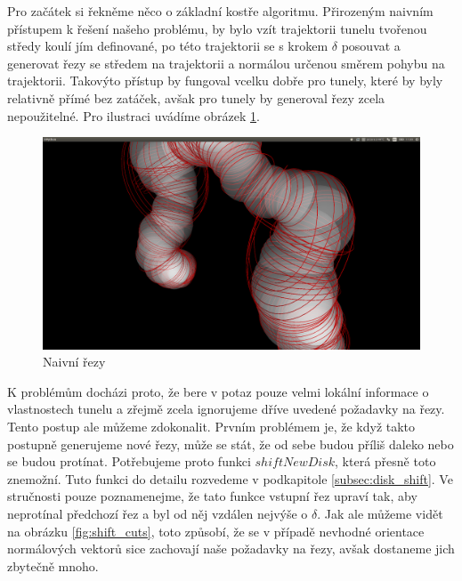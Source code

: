 Pro začátek si řekněme něco o základní kostře algoritmu. Přirozeným naivním přístupem
k řešení našeho problému, by bylo vzít trajektorii tunelu tvořenou středy koulí
jím definované, po této trajektorii se s krokem $ \delta $ posouvat a generovat
řezy se středem na trajektorii a normálou určenou směrem pohybu na trajektorii.
Takovýto přístup by fungoval vcelku dobře pro tunely, které by byly relativně
přímé bez zatáček, avšak pro  tunely by generoval řezy zcela nepoužitelné.
Pro ilustraci uvádíme obrázek \ref{fig:naive_cuts}.

\begin{figure}
    \centering
    \includegraphics[width=\textwidth]{img/naive_cuts.png}
    \caption{Naivní řezy}
  \centering
  \label{fig:naive_cuts}
\end{figure}

K problémům docházi proto, že bere v potaz pouze velmi lokální informace o vlastnostech
tunelu a zřejmě zcela ignorujeme dříve uvedené požadavky na řezy. Tento postup ale
můžeme zdokonalit. Prvním problémem je, že když takto postupně generujeme nové řezy,
může se stát, že od sebe budou příliš daleko nebo se budou protínat. Potřebujeme proto
funkci $ shiftNewDisk $, která přesně toto znemožní. Tuto funkci do detailu rozvedeme v
podkapitole \ref{subsec:disk_shift}. Ve stručnosti pouze poznamenejme, že tato funkce
vstupní řez upraví tak, aby neprotínal předchozí řez a byl od něj vzdálen nejvýše
o $ \delta $. Jak ale můžeme vidět na obrázku \ref{fig:shift_cuts}, toto způsobí,
že se v případě nevhodné orientace normálových vektorů sice zachovají naše
požadavky na řezy, avšak dostaneme jich zbytečně mnoho.

